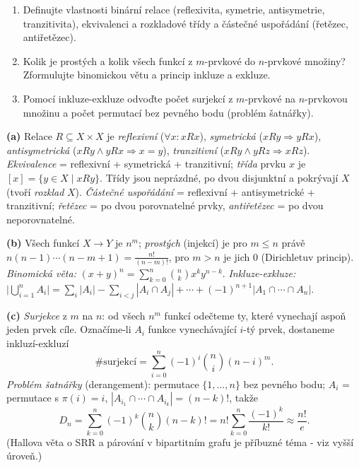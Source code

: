 \begin{zadani}
\begin{enumerate}[label=(\alph*)]
  \item {} Definujte vlastnosti binární relace (reflexivita, symetrie, antisymetrie, tranzitivita), ekvivalenci a rozkladové třídy a částečné uspořádání (řetězec, antiřetězec).
  \item {} Kolik je prostých a kolik všech funkcí z $m$-prvkové do $n$-prvkové množiny? Zformulujte binomickou větu a princip inkluze a exkluze.
  \item {} Pomocí inkluze-exkluze odvoďte počet surjekcí z $m$-prvkové na $n$-prvkovou množinu a počet permutací bez pevného bodu (problém šatnářky).
\end{enumerate}
\end{zadani}

\begin{reseni}
\textbf{(a)} Relace $R\subseteq X\times X$ je \emph{reflexivní} ($\forall x: xRx$), \emph{symetrická} ($xRy\Rightarrow yRx$), \emph{antisymetrická} ($xRy\wedge yRx\Rightarrow x=y$), \emph{tranzitivní} ($xRy\wedge yRz\Rightarrow xRz$). \emph{Ekvivalence} = reflexivní + symetrická + tranzitivní; \emph{třída} prvku $x$ je $[x]=\{y\in X\mid xRy\}$. Třídy jsou neprázdné, po dvou disjunktní a pokrývají $X$ (tvoří \emph{rozklad} $X$). \emph{Částečné uspořádání} = reflexivní + antisymetrické + tranzitivní; \emph{řetězec} = po dvou porovnatelné prvky, \emph{antiřetězec} = po dvou neporovnatelné.

\textbf{(b)} Všech funkcí $X\to Y$ je $n^m$; \emph{prostých} (injekcí) je pro $m\le n$ právě $n(n-1)\cdots(n-m+1)=\frac{n!}{(n-m)!}$, pro $m>n$ je jich $0$ (Dirichletuv princip). \emph{Binomická věta:} $(x+y)^n=\sum_{k=0}^n\binom{n}{k}x^k y^{n-k}$. \emph{Inkluze-exkluze:} $\big|\bigcup_{i=1}^n A_i\big|=\sum_i|A_i|-\sum_{i<j}|A_i\cap A_j|+\cdots+(-1)^{n+1}|A_1\cap\cdots\cap A_n|$.

\textbf{(c)} \emph{Surjekce} z $m$ na $n$: od všech $n^m$ funkcí odečteme ty, které vynechají aspoň jeden prvek cíle. Označíme-li $A_i$ funkce vynechávající $i$-tý prvek, dostaneme inkluzí-exkluzí
\[
\#\text{surjekcí}=\sum_{i=0}^{n}(-1)^i\binom{n}{i}(n-i)^m.
\]
\emph{Problém šatnářky} (derangement): permutace $\{1,\dots,n\}$ bez pevného bodu; $A_i$ = permutace s $\pi(i)=i$, $|A_{i_1}\cap\cdots\cap A_{i_k}|=(n-k)!$, takže
\[
D_n=\sum_{k=0}^n(-1)^k\binom{n}{k}(n-k)!=n!\sum_{k=0}^n\frac{(-1)^k}{k!}\approx \frac{n!}{e}.
\]
(Hallova věta o SRR a párování v bipartitním grafu je příbuzné téma - viz vyšší úroveň.)
\end{reseni}

